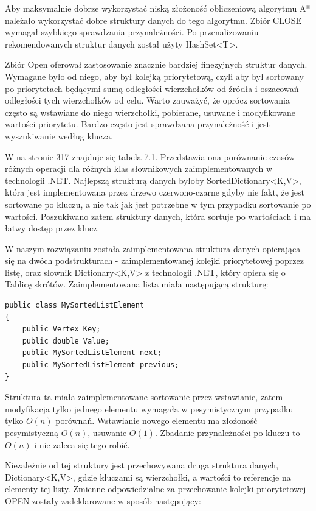 \documentclass[a4paper,11pt,twoside,openright]{report}
\theoremstyle{definition}
\begin{document}
Aby maksymalnie dobrze wykorzystać niską złożoność obliczeniową algorytmu A* należało wykorzystać dobre struktury danych do tego algorytmu. Zbiór CLOSE  wymagał szybkiego sprawdzania przynależności. Po przenalizowaniu rekomendowanych struktur danych \cite{Dotnet struktury} został użyty HashSet<T>.

Zbiór Open oferował zastosowanie znacznie bardziej finezyjnych struktur danych. Wymagane było od niego, aby był kolejką priorytetową, czyli aby był sortowany po priorytetach będącymi sumą odległości wierzchołków od źródła i oszacowań odległości tych wierzchołków od celu. Warto zauważyć, że oprócz sortowania często są wstawiane do niego wierzchołki, pobierane, usuwane i modyfikowane wartości priorytetu. Bardzo często jest sprawdzana przynależność i jest wyszukiwanie według klucza.

W \cite{C w pigulce} na stronie 317 znajduje się tabela 7.1. Przedstawia ona porównanie czasów różnych operacji dla różnych klas słownikowych zaimplementowanych w technologii .NET. Najlepszą strukturą danych byłoby SortedDictionary<K,V>, która jest implementowana przez drzewo czerwono-czarne gdyby nie fakt, że jest sortowane po kluczu, a nie tak jak jest potrzebne w tym przypadku sortowanie po wartości. Poszukiwano zatem struktury danych, która sortuje po wartościach i ma łatwy dostęp przez klucz.

W naszym rozwiązaniu została zaimplementowana struktura danych opierająca się na dwóch podstrukturach - zaimplementowanej kolejki priorytetowej poprzez listę, oraz słownik Dictionary<K,V> z technologii .NET, który opiera się o Tablicę skrótów. Zaimplementowana lista miała następującą strukturę:

\begin{verbatim}
public class MySortedListElement
{
    public Vertex Key;
    public double Value;
    public MySortedListElement next;
    public MySortedListElement previous;
}
\end{verbatim}

Struktura ta miała zaimplementowane sortowanie przez wstawianie, zatem modyfikacja tylko jednego elementu wymagała w pesymistycznym przypadku tylko $O(n)$ porównań. Wstawianie nowego elementu ma złożoność pesymistyczną $O(n)$, usuwanie $O(1)$. Zbadanie przynależności po kluczu to $O(n)$ i nie zaleca się tego robić.

Niezależnie od tej struktury jest przechowywana druga struktura danych, Dictionary<K,V>, gdzie kluczami są wierzchołki, a wartości to referencje na elementy tej listy. Zmienne odpowiedzialne za przechowanie kolejki priorytetowej OPEN zostały zadeklarowane w sposób następujący:
\end{document}
